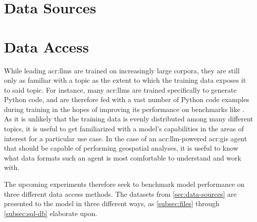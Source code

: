 \begin{comment}
\textit{Morbi viverra ante et tortor faucibus finibus nec sit amet sem. In ultrices, augue sed vestibulum congue, tortor turpis sodales odio, at interdum leo justo non massa. Nunc aliquet, nisl non vestibulum rhoncus, libero tortor laoreet nibh, vel ultricies nunc erat nec nisl. Praesent sed lorem arcu. Sed ultricies, tellus at euismod posuere, felis nibh cursus justo, vitae placerat nisl lorem ut est. Suspendisse sollicitudin sagittis nibh, ac interdum erat hendrerit id. Fusce est mi, semper eget mauris sed, posuere ultrices orci. Aenean nec est eu augue blandit maximus. Morbi ut nisl at metus condimentum tincidunt nec consectetur nibh. Phasellus eleifend dapibus elit ut cursus. Donec lacinia turpis a justo dignissim, sit amet venenatis libero pellentesque. Orci varius natoque penatibus et magnis dis parturient montes, nascetur ridiculus mus.}
\end{comment}



\section{Data Sources}
\label{sec:data-sources}



\section{Data Access}
\label{sec:data-access}

While leading \glspl{acr:llm} are trained on increasingly large corpora, they are still only as familiar with a topic as the extent to which the training data exposes it to said topic. For instance, many \glspl{acr:llm} are trained specifically to generate Python code, and are therefore fed with a vast number of Python code examples during training in the hopes of improving its performance on benchmarks like . As it is unlikely that the training data is evenly distributed among many different topics, it is useful to get familiarized with a model's capabilities in the areas of interest for a particular use case. In the case of an \acrshort{acr:llm}-powered \acrshort{acr:gis} agent that should be capable of performing geospatial analyses, it is useful to know what data formats such an agent is most comfortable to understand and work with.

The upcoming experiments therefore seek to benchmark model performance on three different data access methods. The datasets from \autoref{sec:data-sources} are presented to the model in three different ways, as \autoref{subsec:files} through \autoref{subsec:sql-db} elaborate upon.

